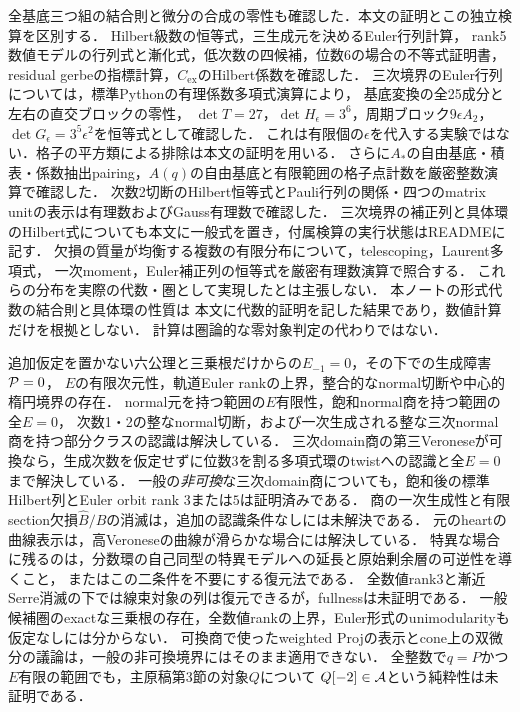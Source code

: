 \documentclass[11pt,a4paper]{ltjsarticle}
\begin{document}
\begin{description}[style=nextline]
全基底三つ組の結合則と微分の合成の零性も確認した．本文の証明とこの独立検算を区別する．
Hilbert級数の恒等式，三生成元を決めるEuler行列計算，
rank5数値モデルの行列式と漸化式，低次数の四候補，位数6の場合の不等式証明書，
residual gerbeの指標計算，$C_{\mathrm{ex}}$のHilbert係数を確認した．
三次境界のEuler行列については，標準Pythonの有理係数多項式演算により，
基底変換の全25成分と左右の直交ブロックの零性，
$\det T=27$，$\det H_\epsilon=3^6$，周期ブロック$9\epsilon A_2$，
$\det G_\epsilon=3^5\epsilon^2$を恒等式として確認した．
これは有限個の$\epsilon$を代入する実験ではない．格子の平方類による排除は本文の証明を用いる．
さらに$A_*$の自由基底・積表・係数抽出pairing，$A(q)$の自由基底と有限範囲の格子点計数を厳密整数演算で確認した．
次数2切断のHilbert恒等式とPauli行列の関係・四つのmatrix unitの表示は有理数およびGauss有理数で確認した．
三次境界の補正列と具体環のHilbert式についても本文に一般式を置き，付属検算の実行状態はREADMEに記す．
欠損の質量が均衡する複数の有限分布について，telescoping，Laurent多項式，
一次moment，Euler補正列の恒等式を厳密有理数演算で照合する．
これらの分布を実際の代数・圏として実現したとは主張しない．
本ノートの形式代数の結合則と具体環の性質は
本文に代数的証明を記した結果であり，数値計算だけを根拠としない．
計算は圏論的な零対象判定の代わりではない．
\item[未証明]
追加仮定を置かない六公理と三乗根だけからの$E_{-1}=0$，その下での生成障害$\mathcal P=0$，
$E$の有限次元性，軌道Euler rankの上界，整合的なnormal切断や中心的楕円境界の存在．
normal元を持つ範囲の$E$有限性，飽和normal商を持つ範囲の全$E=0$，
次数1・2の整なnormal切断，および一次生成される整な三次normal商を持つ部分クラスの認識は解決している．
三次domain商の第三Veroneseが可換なら，生成次数を仮定せずに位数$3$を割る多項式環のtwistへの認識と全$E=0$まで解決している．
一般の\emph{非可換}な三次domain商についても，飽和後の標準Hilbert列とEuler orbit rank $3$または$5$は証明済みである．
商の一次生成性と有限section欠損$\widehat B/B$の消滅は，追加の認識条件なしには未解決である．
元のheartの曲線表示は，高Veroneseの曲線が滑らかな場合には解決している．
特異な場合に残るのは，分数環の自己同型の特異モデルへの延長と原始剰余層の可逆性を導くこと，
またはこの二条件を不要にする復元法である．
全数値rank3と漸近Serre消滅の下では線束対象の列は復元できるが，fullnessは未証明である．
一般候補圏のexactな三乗根の存在，全数値rankの上界，Euler形式のunimodularityも仮定なしには分からない．
可換商で使ったweighted Projの表示とcone上の双微分の議論は，一般の非可換境界にはそのまま適用できない．
全整数で$q=P$かつ$E$有限の範囲でも，主原稿第3節の対象$Q$について
$Q[-2]\in\mathcal A$という純粋性は未証明である．
\item[新規性]

\end{description}
\end{document}
